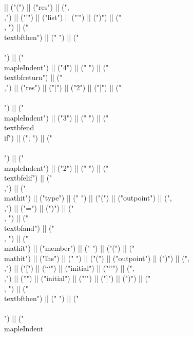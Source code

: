 \documentclass{article}
\begin{document}
\begin{center}
\begin{maplelatex}
{|| ("(") || ("res") || (",\\,") || ("'") || ("list") || ("'") || (")") || (" \\, ") || ("\\textbf{then}") || (" ") || ("\\\\\n") || ("\\mapleIndent{") || ("4") || ("} ") || ("\\textbf{return}") || ("\\,") || ("res") || ("[") || ("2") || ("]") || ("\\\\\n") || ("\\mapleIndent{") || ("3") || ("} ") || ("\\textbf{end\\ if}") || ("; ") || ("\\\\\n") || ("\\mapleIndent{") || ("2") || ("} ") || ("\\textbf{elif}") || (" \\,") || ("\\mathit{") || ("type") || ("} ") || ("(") || ("outpoint") || (",\\,") || ("=") || (")") || (" \\, ") || ("\\textbf{and}") || (" \\, ") || ("\\mathit{") || ("member") || ("} ") || ("(") || ("\\mathit{") || ("lhs") || ("} ") || ("(") || ("outpoint") || (")") || (",\\,") || ("[") || ("``") || ("initial") || ("''") || (",\\,") || ("'") || ("initial") || ("'") || ("]") || (")") || (" \\, ") || ("\\textbf{then}") || (" ") || ("\\\\\n") || ("\\mapleIndent}
\end{maplelatex}
\end{center}
\end{document}

